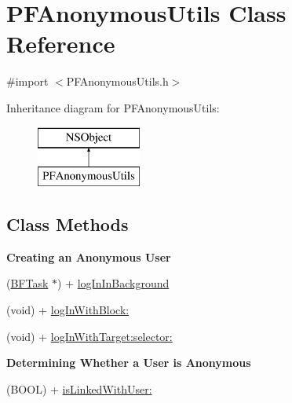 \hypertarget{interface_p_f_anonymous_utils}{}\section{P\+F\+Anonymous\+Utils Class Reference}
\label{interface_p_f_anonymous_utils}


{\ttfamily \#import $<$P\+F\+Anonymous\+Utils.\+h$>$}

Inheritance diagram for P\+F\+Anonymous\+Utils\+:\begin{figure}[H]
\begin{center}
\leavevmode
\includegraphics[height=2.000000cm]{interface_p_f_anonymous_utils}
\end{center}
\end{figure}
\subsection*{Class Methods}
\begin{Indent}{\bf Creating an Anonymous User}\par
{\em 

 

 }\begin{DoxyCompactItemize}
\item 
(\hyperlink{interface_b_f_task}{B\+F\+Task} $\ast$) + \hyperlink{interface_p_f_anonymous_utils_a45b63477e2ff44a1ec2e3ea4438253c8}{log\+In\+In\+Background}
\item 
(void) + \hyperlink{interface_p_f_anonymous_utils_abafd88ec76cac16323cfae10eebd391e}{log\+In\+With\+Block\+:}
\item 
(void) + \hyperlink{interface_p_f_anonymous_utils_a5e5b5bbca5fb7403410c5eaa06a04a10}{log\+In\+With\+Target\+:selector\+:}
\end{DoxyCompactItemize}
\end{Indent}
\begin{Indent}{\bf Determining Whether a User is Anonymous}\par
{\em 

 

 }\begin{DoxyCompactItemize}
\item 
(B\+O\+O\+L) + \hyperlink{interface_p_f_anonymous_utils_af0d0bc5278f9633dd22d648f8c0a5c76}{is\+Linked\+With\+User\+:}
\end{DoxyCompactItemize}
\end{Indent}


